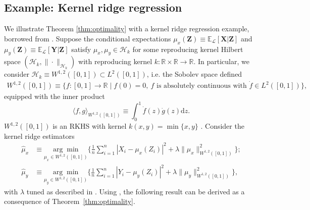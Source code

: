 \documentclass[12pt]{article}
\theoremstyle{definition}
\theoremstyle{remark}
\newcommand{\E}{\mathbb E}								%
\newcommand{\argmin}[1]{\underset{#1}{\arg \min}}       %
\newcommand{\prx}{\bm X}								%
\newcommand{\prz}{\bm Z}								%
\newcommand{\pry}{{\bm Y}}								%
\newcommand{\law}{\mathcal L}							%
\renewcommand{\H}{\mathcal H}		 					%
\begin{document}
	\subsection{Example: Kernel ridge regression} \label{sec:kernel-ridge-regression}
	We illustrate Theorem \ref{thm:optimality} with a kernel ridge regression example, borrowed from \citet[Section 4]{Shah2018}. Suppose the conditional expectations $\mu_x(\prz) \equiv \E_{\law}[\prx|\prz]$ and $\mu_y(\prz) \equiv \E_{\law}[\pry|\prz]$ satisfy $\mu_x, \mu_y \in \H_k$ for some reproducing kernel Hilbert space $(\H_k,\|\cdot\|_{\H_k})$ with reproducing kernel $k:\mathbb{R}\times\mathbb{R}\rightarrow\mathbb{R}$. In particular, we consider $\H_k \equiv W^{1,2}([0,1]) \subset L^2([0,1])$, i.e. the Sobolev space defined 
	\begin{align*}
		W^{1,2}([0,1]) \equiv \big\{f:[0,1]\rightarrow \mathbb{R} \mid f(0)=0,\ f \text{ is absolutely continuous with } \dot{f}\in L^2([0,1])\big\},
	\end{align*} 
	equipped with the inner product
	\begin{equation*}
		\langle f,g\rangle_{W^{1,2}([0,1])} \equiv \int_0^1\dot{f}(z)\dot{g}(z)\mathrm{d}z.
	\end{equation*}
	$W^{1,2}([0,1])$ is an RKHS with kernel $k(x,y)=\min\{x,y\}$ \citep[Example 12.16]{Wainwright2019}. Consider the kernel ridge estimators
	\begin{equation}
		\begin{split}
			\widehat \mu_x &\equiv \argmin{\mu_x \in W^{1,2}([0,1])}\bigg\{\frac{1}{n}\sum_{i=1}^n|X_i-\mu_x(Z_i)|^2+\lambda\|\mu_x\|_{W^{1,2}([0,1])}^2\bigg\};\\ 
			\widehat \mu_y &\equiv \argmin{\mu_y \in W^{1,2}([0,1])}\bigg\{\frac{1}{n}\sum_{i=1}^n|Y_i-\mu_y(Z_i)|^2+\lambda\|\mu_y\|_{W^{1,2}([0,1])}^2\bigg\},
			\label{eq:kernel-ridge-estimators}
		\end{split}
	\end{equation}
	with $\lambda$ tuned as described in \citet[Section 4]{Shah2018}. Using \citet[Theorem 11]{Shah2018}, the following result can be derived as a consequence of Theorem~\ref{thm:optimality}.
	
\end{document}
